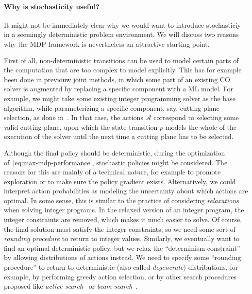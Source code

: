\documentclass[a4paper]{report}
\theoremstyle{definition}
\theoremstyle{plain}
\begin{document}
\paragraph{Why is stochasticity useful?}
It might not be immediately clear why we would want to introduce stochasticiy in
a seemingly deterministic problem environment.
%
We will discuss two reasons why the MDP framework is nevertheless an attractive
starting point.

First of all, non-deterministic transitions can be used to model certain parts
of the computation that are too complex to model explicitly.
%
This has for example been done in previouw joint methods, in which some part of
an existing CO solver is augmented by replacing a specific component with a ML
model.
%
For example, we might take some existing integer programming solver as the base
algorithm, while parameterizing a specific component, say, cutting plane
selection, as done in~\cite{tangReinforcementLearningInteger2020}.
%
In that case, the actions $\mathcal{A}$ correspond to selecting some valid
cutting plane, upon which the state transition $p$ models the whole of the
execution of the solver until the next time a cutting plane has to be selected.

Although the final policy should be deterministic, during the optimization of~\eqref{eq:max-mdp-performance}, stochastic policies might be considered.
%
The reasons for this are mainly of a technical nature, for example to promote
exploration or to make sure the policy gradient exists. Alternatively, we could
interpret action probabilities as modeling the uncertainty about which actions
are optimal.
%
In some sense, this is similar to the practice of considering \emph{relaxations}
when solving integer programs. In the relaxed version of an integer program, the
integer constraints are removed, which makes it much easier to solve. Of course,
the final solution must satisfy the integer constraints, so we need some sort of
\emph{rounding procedure} to return to integer values.
%
Similarly, we eventually want to find an optimal deterministic policy, but we
relax the ``determinism constraint'' by allowing distributions of actions
instead.
%
We need to specify some ``rounding procedure'' to return to deterministic (also
called \emph{degenerate}) distributions, for example, by performing greedy
action selection, or by other search procedures proposed like \emph{active
  search}~\cite{belloNeuralCombinatorialOptimization2017} or \emph{beam
  search}~\cite{koolLearningOptimizationCombinatorial2022}.
\end{document}
